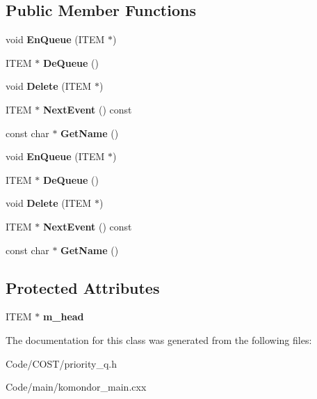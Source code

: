 \subsection*{Public Member Functions}
\begin{DoxyCompactItemize}
\item 
\mbox{\label{classSimpleQueue_a816e12519de7a77e3e55d9d0222c1975}} 
void {\bfseries En\+Queue} (I\+T\+EM $\ast$)
\item 
\mbox{\label{classSimpleQueue_ab1e9448a895792c4665095236cd245f0}} 
I\+T\+EM $\ast$ {\bfseries De\+Queue} ()
\item 
\mbox{\label{classSimpleQueue_a51b75732069784c8b31c1108a9ed6600}} 
void {\bfseries Delete} (I\+T\+EM $\ast$)
\item 
\mbox{\label{classSimpleQueue_a7b969f0f18dadd1ba34317418ec25fc1}} 
I\+T\+EM $\ast$ {\bfseries Next\+Event} () const
\item 
\mbox{\label{classSimpleQueue_a591aa911e8c3724f12ab833fbdc0f1fe}} 
const char $\ast$ {\bfseries Get\+Name} ()
\item 
\mbox{\label{classSimpleQueue_a816e12519de7a77e3e55d9d0222c1975}} 
void {\bfseries En\+Queue} (I\+T\+EM $\ast$)
\item 
\mbox{\label{classSimpleQueue_a2dc0a8e14384408415714ad0e4323cb2}} 
I\+T\+EM $\ast$ {\bfseries De\+Queue} ()
\item 
\mbox{\label{classSimpleQueue_a51b75732069784c8b31c1108a9ed6600}} 
void {\bfseries Delete} (I\+T\+EM $\ast$)
\item 
\mbox{\label{classSimpleQueue_a7b969f0f18dadd1ba34317418ec25fc1}} 
I\+T\+EM $\ast$ {\bfseries Next\+Event} () const
\item 
\mbox{\label{classSimpleQueue_a42654fff4c0489f36fd7fd5819c00684}} 
const char $\ast$ {\bfseries Get\+Name} ()
\end{DoxyCompactItemize}
\subsection*{Protected Attributes}
\begin{DoxyCompactItemize}
\item 
\mbox{\label{classSimpleQueue_ab11356f9767f5974a2ce5f2864384983}} 
I\+T\+EM $\ast$ {\bfseries m\+\_\+head}
\end{DoxyCompactItemize}


The documentation for this class was generated from the following files\+:\begin{DoxyCompactItemize}
\item 
Code/\+C\+O\+S\+T/priority\+\_\+q.\+h\item 
Code/main/komondor\+\_\+main.\+cxx\end{DoxyCompactItemize}
